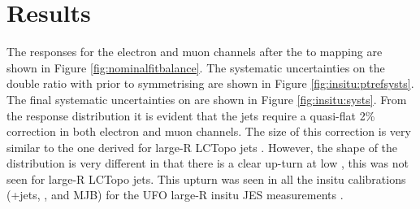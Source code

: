 \section{Results\label{sec:insitu:results}}
The responses \rdb for the electron and muon channels after the \ptref to \ptJ mapping are shown in Figure \ref{fig:nominalfitbalance}. The systematic uncertainties on the double ratio with \ptref prior to symmetrising are shown in Figure \ref{fig:insitu:ptrefsysts}. The final systematic uncertainties on \ptJ are shown in Figure \ref{fig:insitu:systs}. From the response distribution it is evident that the jets require a quasi-flat 2\% correction in both electron and muon channels. The size of this correction is very similar to the one derived for large-R LCTopo jets \cite{Atlas:largercali}. However, the shape of the \rdb distribution is very different in that there is a clear up-turn at low \ptJ, this was not seen for large-R LCTopo jets. This upturn was seen in all the insitu calibrations (\gamma+jets, \zjets, and MJB) for the UFO large-R insitu JES measurements \cite{Insitu:combination}. 

